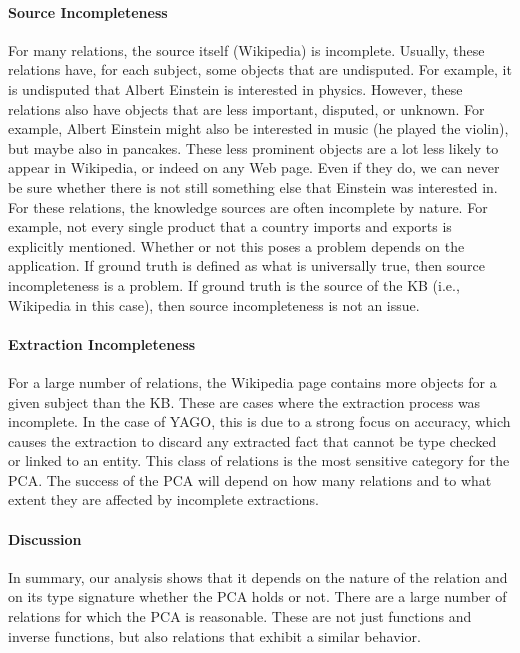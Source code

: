\paragraph{Source Incompleteness} For many relations, the source itself (Wikipedia) is incomplete.
Usually, these relations have, for each subject, some objects that are undisputed.
For example, it is undisputed that Albert Einstein is interested in physics. However, these relations also have objects that are less important, disputed, or unknown.
For example, Albert Einstein might also be interested in music (he played the violin), but maybe also in pancakes.
These less prominent objects are a lot less likely to appear in Wikipedia, or indeed on any Web page.
Even if they do, we can never be sure whether there is not still something else that Einstein was interested in.
For these relations, the knowledge sources are often incomplete by nature.
For example, not every single product that a country imports and exports is explicitly mentioned.
Whether or not this poses a problem depends on the application.
If ground truth is defined as what is universally true, then source incompleteness is a problem.
If ground truth is the source of the KB (i.e., Wikipedia in this case), then source incompleteness is not an issue.



\paragraph{Extraction Incompleteness} For a large number of relations, the Wikipedia page contains more objects for a given subject than the KB.
These are cases where the extraction process was incomplete.
In the case of YAGO, this is due to a strong focus on accuracy,
which causes the extraction to discard any extracted fact that cannot be type checked or linked to an entity.
This class of relations is the most sensitive category for the PCA.
The success of the PCA will depend on how many relations and to what extent they are affected by incomplete extractions.

\paragraph{Discussion} In summary, our analysis shows that it depends on the nature of the relation and on its type signature whether the PCA holds or not.
 There are a large number of relations for which the PCA is reasonable.
These are not just functions and inverse functions, but also relations that exhibit a similar behavior.

